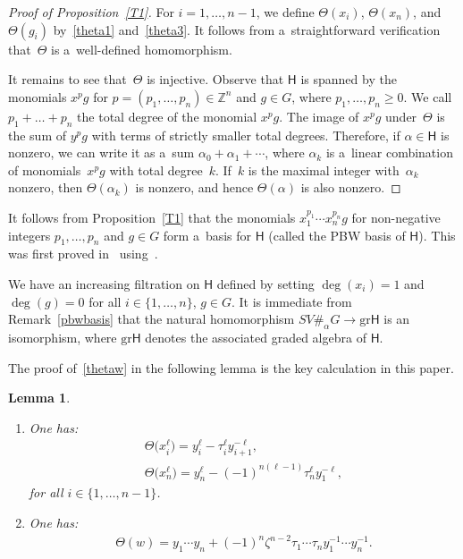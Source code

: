 \documentclass[pdftex]{sigma}
\numberwithin{equation}{section}
\newtheorem{Lemma}[Theorem]{Lemma}
\begin{document}
\begin{proof}
[Proof of Proposition~\ref{T1}]
For $i=1,\ldots, n-1$, we def\/ine $\Theta(x_i)$, $\Theta(x_n)$, and $\Theta(g_i)$
by~\eqref{theta1} and~\eqref{theta3}.
It follows from a~straightforward verif\/ication that~$\Theta$ is a~well-def\/ined homomorphism.



It remains to see that~$\Theta$ is injective.
Observe that $\mathsf{H}$ is spanned by the monomials $x^p g$ for $p=(p_1,\dots,p_n)\in {\mathbb{Z}}^n$ and $g\in G$,
where $p_1,\ldots, p_n\ge 0$.
We call $p_1+\dots+p_n$ the total degree of the monomial $x^p g$.
The image of $x^p g$ under~$\Theta$ is the sum of $y^p g$ with terms of strictly smaller total degrees.
Therefore, if $\alpha\in \mathsf{H}$ is nonzero, we can write it as a~sum $\alpha_0 + \alpha_1 + \cdots$, where
$\alpha_k$ is a~linear combination of monomials~$x^p g$ with total degree~$k$.
If~$k$ is the maximal integer with~$\alpha_k$ nonzero, then $\Theta(\alpha_k)$ is nonzero, and hence $\Theta(\alpha)$ is
also nonzero.
\end{proof}

\begin{Remark}
\label{pbwbasis}
It follows from Proposition~\ref{T1} that the monomials $x_1^{p_1}\cdots x_n^{p_n} g$ for non-negative integers $p_1,
\ldots, p_n$ and $g\in G$ form a~basis for $\mathsf{H}$ (called the PBW basis of $\mathsf{H}$).
This was f\/irst proved in~\cite[Example 2.16]{W} using~\cite[Theorem 2.10]{W}.
\end{Remark}

We have an increasing f\/iltration on $\mathsf{H}$ def\/ined by setting $\deg(x_i)=1$ and $\deg(g)=0$ for all
$i\in\{1,\ldots,n\}$, $g\in G$.
It is immediate from Remark~\ref{pbwbasis} that the natural homomorphism $SV\#_\alpha G \to {\mathrm{gr}} \mathsf{H}$ is
an isomorphism, where ${\mathrm{gr}} \mathsf{H}$ denotes the associated graded algebra of $\mathsf{H}$.

The proof of~\eqref{thetaw} in the following lemma is the key calculation in this paper.

\begin{Lemma}\label{keylemma}\quad
\begin{enumerate}\itemsep=0pt
\item[$(i)$] One has:
\begin{gather}
\Theta\big(x_i^\ell\big) = y_i^\ell - \tau_i^\ell y_{i+1}^{-\ell},
\label{thetaxil}
\\
\Theta\big(x_n^\ell\big) = y_n^\ell - (-1)^{n(\ell-1)} \tau_n^\ell y_1^{-\ell},
\label{thetaxnl}
\end{gather}
for all $i\in \{1,\ldots, n-1\}$.

\item[$(ii)$] One has:
\begin{gather}
\label{thetaw}
\Theta(w) = y_1\cdots y_n + (-1)^n \zeta^{n-2} \tau_1\cdots \tau_n y_1^{-1} \cdots y_n^{-1}.
\end{gather}
\end{enumerate}
\end{Lemma}
\end{document}
